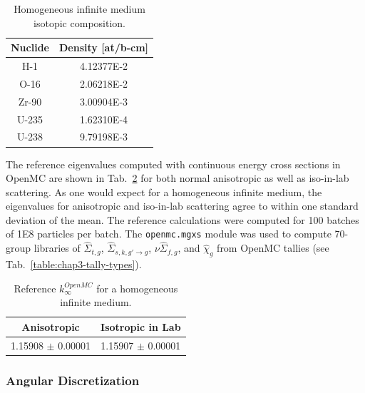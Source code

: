 \begin{table}[h!]
  \centering
  \caption[Infinite medium isotopic composition]{Homogeneous infinite medium isotopic composition.}
  \small
  \label{table:chap5-inf-med-isotopes} 
  \vspace{6pt}
  \begin{tabular}{c c}
  \toprule
  \rowcolor{lightgray}
  {\bf Nuclide} &
  {\bf Density [at/b-cm]} \\
  \midrule
  H-1 &   4.12377E-2 \\
  O-16 &  2.06218E-2 \\
  Zr-90 & 3.00904E-3 \\
  U-235 & 1.62310E-4 \\
  U-238 & 9.79198E-3 \\
  \bottomrule
\end{tabular}
\end{table}

The reference eigenvalues computed with continuous energy cross sections in OpenMC are shown in Tab.~\ref{table:chap5-inf-med-reference} for both normal anisotropic as well as iso-in-lab scattering. As one would expect for a homogeneous infinite medium, the eigenvalues for anisotropic and iso-in-lab scattering agree to within one standard deviation of the mean. The reference calculations were computed for 100 batches of 1E8 particles per batch. The \texttt{openmc.mgxs} module was used to compute 70-group libraries of $\hat{\Sigma}_{t,g}$, $\hat{\Sigma}_{s,k,g'\rightarrow g}$, $\nu\hat{\Sigma}_{f,g}$, and $\hat{\chi}_{g}$ from OpenMC tallies (see Tab.~\ref{table:chap3-tally-types}).

\begin{table}[h!]
  \centering
  \caption[Reference $k^{OpenMC}_{\infty}$ for an infinite medium]{Reference $k^{OpenMC}_{\infty}$ for a homogeneous infinite medium.}
  \small
  \label{table:chap5-inf-med-reference} 
  \vspace{6pt}
  \begin{tabular}{c c}
  \toprule
  \rowcolor{lightgray}
  {\cellcolor{carolinablue} {\bf Anisotropic}} &
  {\cellcolor{lightgreen} {\bf Isotropic in Lab}} \\
  \midrule
  1.15908 $\pm$ 0.00001 & 1.15907 $\pm$ 0.00001 \\
  \bottomrule
\end{tabular}
\end{table}

\subsubsection{Angular Discretization}
\label{subsubsec:chap5-inf-med-angle}

